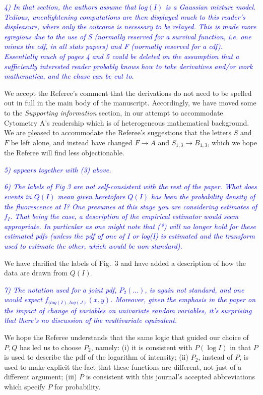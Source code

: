 \documentclass[letter,11pt,draft]{article}
\newcommand{\re}[1]{\emph{\textcolor{blue}{#1}}}
\begin{document}
\re{
4) In that section, the authors assume that $log(I)$ is a Gaussian mixture model. Tedious, unenlightening computations are then displayed much to this reader's displeasure, where only the outcome is necessary to be relayed. This is made more egregious due to the use of S (normally reserved for a survival function, i.e.  one minus the cdf, in all stats papers) and F (normally reserved for a cdf).  Essentially much of pages 4 and 5 could be deleted on the assumption that a sufficiently interested reader probably knows how to take derivatives and/or work mathematica, and the chase can be cut to.
}

\smallskip
We accept the Referee's comment that the derivations do not need to be spelled out in full in the main body of the manuscript. Accordingly, we have moved some to the \emph{Supporting information} section, in our attempt to accommodate Cytometry A's readership which is of heterogeneous mathematical background. We are pleased to accommodate the Referee's suggestions that the letters $S$ and $F$ be left alone, and instead have changed $F\rightarrow A$ and $S_{1,3}\rightarrow B_{1,3}$, which we hope the Referee will find less objectionable.

\re{5) appears together with (3) above.}

\smallskip
\re{
6) The labels of Fig 3 are not self-consistent with the rest of the paper. What does events in $Q(I)$ mean given heretofore $Q(I)$ has been the probability density of the fluorescence at I? One presumes at this stage you are considering estimates of $f_I$. That being the case, a description of the empirical estimator would seem appropriate. In particular as one might note that (*) will no longer hold for these estimated pdfs (unless the pdf of one of I or log(I) is estimated and the transform used to estimate the other, which would be non-standard).
}

\smallskip
We have clarified the labels of Fig.~3 and have added a description of how the data are drawn from $Q(I)$.

\re{7) The notation used for a joint pdf, $P_2(...)$, is again not standard, and one would expect $f_{(log(I),log(J)}(x,y)$. Moreover, given the emphasis in the paper on the impact of change of variables on univariate random variables, it's surprising that there's no discussion of the multivariate equivalent.}

\smallskip
We hope the Referee understands that the same logic that guided our choice of $P,Q$ has led us to choose $P_2$, namely: (i) it is consistent with $P(\log I)$ in that $P$ is used to describe the pdf of the logarithm of intensity; (ii) $P_2$, instead of $P$, is used to make explicit the fact that these functions are different, not just of a different argument; (iii) $P$ is consistent with this journal's accepted abbreviations which specify $P$ for probability.
\end{document}
